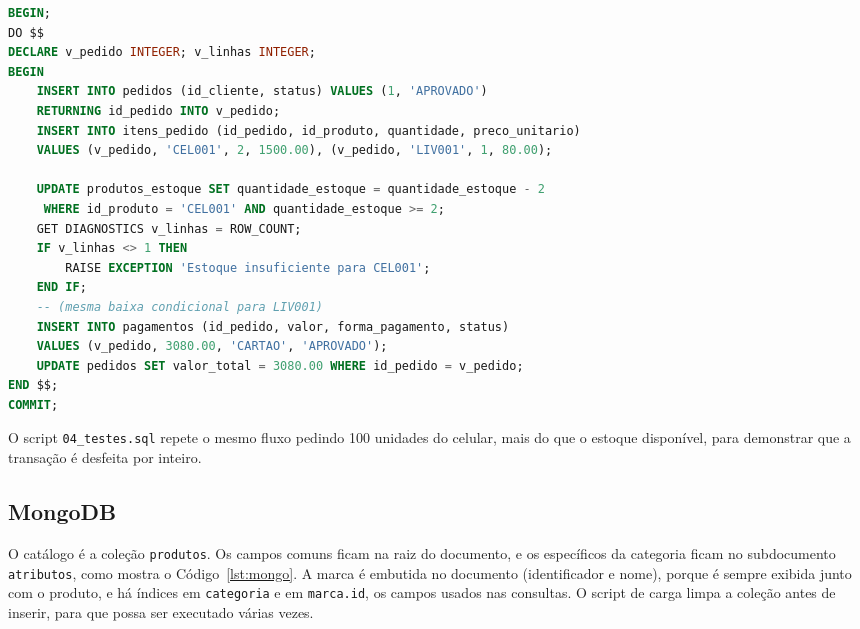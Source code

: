 \documentclass[12pt,a4paper,oneside]{article}
\newcommand{\fonte}[1]{%
  \begin{spacing}{1.0}\noindent{\footnotesize Fonte: #1.}\end{spacing}%
  \vspace{4pt}%
}
\begin{document}
\noindent\begin{minipage}{\linewidth}
\begin{spacing}{1.0}
\begin{lstlisting}[language=SQL, caption={Trecho da transação de registro do pedido (R1)}, label={lst:pg}]
BEGIN;
DO $$
DECLARE v_pedido INTEGER; v_linhas INTEGER;
BEGIN
    INSERT INTO pedidos (id_cliente, status) VALUES (1, 'APROVADO')
    RETURNING id_pedido INTO v_pedido;
    INSERT INTO itens_pedido (id_pedido, id_produto, quantidade, preco_unitario)
    VALUES (v_pedido, 'CEL001', 2, 1500.00), (v_pedido, 'LIV001', 1, 80.00);

    UPDATE produtos_estoque SET quantidade_estoque = quantidade_estoque - 2
     WHERE id_produto = 'CEL001' AND quantidade_estoque >= 2;
    GET DIAGNOSTICS v_linhas = ROW_COUNT;
    IF v_linhas <> 1 THEN
        RAISE EXCEPTION 'Estoque insuficiente para CEL001';
    END IF;
    -- (mesma baixa condicional para LIV001)
    INSERT INTO pagamentos (id_pedido, valor, forma_pagamento, status)
    VALUES (v_pedido, 3080.00, 'CARTAO', 'APROVADO');
    UPDATE pedidos SET valor_total = 3080.00 WHERE id_pedido = v_pedido;
END $$;
COMMIT;
\end{lstlisting}
\end{spacing}
\end{minipage}
\fonte{Elaborado pelos autores (2026)}

O script \texttt{04\_testes.sql} repete o mesmo fluxo pedindo 100 unidades do celular, mais do que o estoque disponível, para demonstrar que a transação é desfeita por inteiro.

\subsection{MongoDB}

O catálogo é a coleção \texttt{produtos}. Os campos comuns ficam na raiz do documento, e os específicos da categoria ficam no subdocumento \texttt{atributos}, como mostra o Código~\ref{lst:mongo}. A marca é embutida no documento (identificador e nome), porque é sempre exibida junto com o produto, e há índices em \texttt{categoria} e em \texttt{marca.id}, os campos usados nas consultas. O script de carga limpa a coleção antes de inserir, para que possa ser executado várias vezes.
\end{document}
